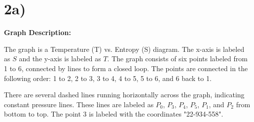 

\section*{2a)}

\begin{center}
\textbf{Graph Description:}
\end{center}

The graph is a Temperature (T) vs. Entropy (S) diagram. The x-axis is labeled as \( S \) and the y-axis is labeled as \( T \). The graph consists of six points labeled from 1 to 6, connected by lines to form a closed loop. The points are connected in the following order: 1 to 2, 2 to 3, 3 to 4, 4 to 5, 5 to 6, and 6 back to 1. 

There are several dashed lines running horizontally across the graph, indicating constant pressure lines. These lines are labeled as \( P_0 \), \( P_3 \), \( P_4 \), \( P_5 \), \( P_1 \), and \( P_2 \) from bottom to top. The point 3 is labeled with the coordinates "22-934-558".